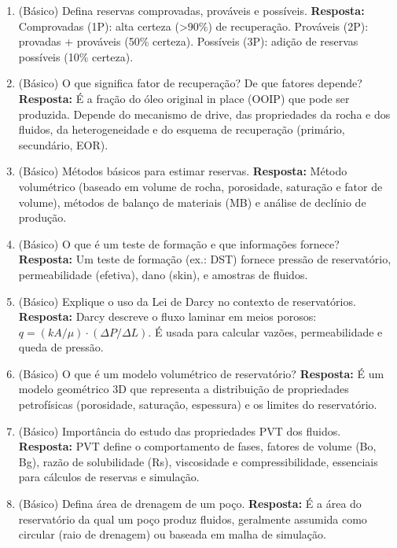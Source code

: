 \documentclass[11pt,a4paper]{article}
\begin{document}
\begin{enumerate}
  \item (Básico) Defina reservas comprovadas, prováveis e possíveis.
  \textbf{Resposta:} Comprovadas (1P): alta certeza (>90\%) de recuperação. Prováveis (2P): provadas + prováveis (50\% certeza). Possíveis (3P): adição de reservas possíveis (10\% certeza).

  \item (Básico) O que significa fator de recuperação? De que fatores depende?
  \textbf{Resposta:} É a fração do óleo original in place (OOIP) que pode ser produzida. Depende do mecanismo de drive, das propriedades da rocha e dos fluidos, da heterogeneidade e do esquema de recuperação (primário, secundário, EOR).

  \item (Básico) Métodos básicos para estimar reservas.
  \textbf{Resposta:} Método volumétrico (baseado em volume de rocha, porosidade, saturação e fator de volume), métodos de balanço de materiais (MB) e análise de declínio de produção.

  \item (Básico) O que é um teste de formação e que informações fornece?
  \textbf{Resposta:} Um teste de formação (ex.: DST) fornece pressão de reservatório, permeabilidade (efetiva), dano (skin), e amostras de fluidos.

  \item (Básico) Explique o uso da Lei de Darcy no contexto de reservatórios.
  \textbf{Resposta:} Darcy descreve o fluxo laminar em meios porosos: $q = (kA/\mu) \cdot (\Delta P/\Delta L)$. É usada para calcular vazões, permeabilidade e queda de pressão.

  \item (Básico) O que é um modelo volumétrico de reservatório?
  \textbf{Resposta:} É um modelo geométrico 3D que representa a distribuição de propriedades petrofísicas (porosidade, saturação, espessura) e os limites do reservatório.

  \item (Básico) Importância do estudo das propriedades PVT dos fluidos.
  \textbf{Resposta:} PVT define o comportamento de fases, fatores de volume (Bo, Bg), razão de solubilidade (Rs), viscosidade e compressibilidade, essenciais para cálculos de reservas e simulação.

  \item (Básico) Defina área de drenagem de um poço.
  \textbf{Resposta:} É a área do reservatório da qual um poço produz fluidos, geralmente assumida como circular (raio de drenagem) ou baseada em malha de simulação.


\end{enumerate}
\end{document}
